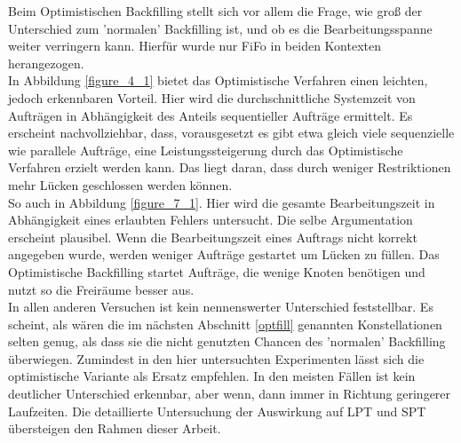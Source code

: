 Beim Optimistischen Backfilling stellt sich vor allem die Frage, wie groß der Unterschied zum 'normalen' Backfilling ist, und ob es die Bearbeitungsspanne weiter verringern kann. Hierfür wurde nur FiFo in beiden Kontexten herangezogen.\\
In Abbildung \ref{figure_4_1} bietet das Optimistische Verfahren einen leichten, jedoch erkennbaren Vorteil. Hier wird die durchschnittliche Systemzeit von Aufträgen in Abhängigkeit des Anteils sequentieller Aufträge ermittelt. Es erscheint nachvollziehbar, dass, vorausgesetzt es gibt etwa gleich viele sequenzielle wie parallele Aufträge, eine Leistungssteigerung durch das Optimistische Verfahren erzielt werden kann. Das liegt daran, dass durch weniger Restriktionen mehr Lücken geschlossen werden können.\\
So auch in Abbildung \ref{figure_7_1}. Hier wird die gesamte Bearbeitungszeit in Abhängigkeit eines erlaubten Fehlers untersucht. Die selbe Argumentation erscheint plausibel. Wenn die Bearbeitungszeit eines Auftrags nicht korrekt angegeben wurde, werden weniger Aufträge gestartet um Lücken zu füllen. Das Optimistische Backfilling startet Aufträge, die wenige Knoten benötigen und nutzt so die Freiräume besser aus.\\
In allen anderen Versuchen ist kein nennenswerter Unterschied feststellbar. Es scheint, als wären die im nächsten Abschnitt \ref{optfill} genannten Konstellationen selten genug, als dass sie die nicht genutzten Chancen des 'normalen' Backfilling überwiegen. Zumindest in den hier untersuchten Experimenten lässt sich die optimistische Variante als Ersatz empfehlen. In den meisten Fällen ist kein deutlicher Unterschied erkennbar, aber wenn, dann immer in Richtung geringerer Laufzeiten. Die detaillierte Untersuchung der Auswirkung auf LPT und SPT übersteigen den Rahmen dieser Arbeit. 

\FloatBarrier

